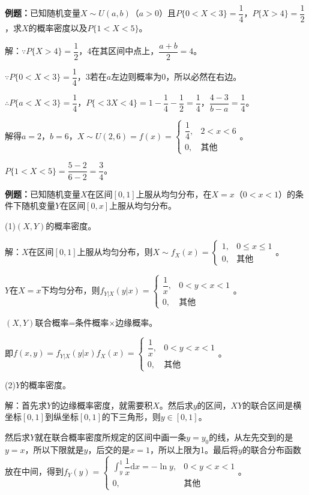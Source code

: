 \documentclass[UTF8, 12pt]{ctexart}
\begin{document}
\textbf{例题：}已知随机变量$X\sim U(a,b)$（$a>0$）且$P\{0<X<3\}=\dfrac{1}{4}$，$P\{X>4\}=\dfrac{1}{2}$，求$X$的概率密度以及$P\{1<X<5\}$。

解：$\because P\{X>4\}=\dfrac{1}{2}$，4在其区间中点上，$\dfrac{a+b}{2}=4$。

$\because P\{0<X<3\}=\dfrac{1}{4}$，$3$若在$a$左边则概率为0，所以必然在右边。

$\therefore P\{a<X<3\}=\dfrac{1}{4}$，$P\{<3X<4\}=1-\dfrac{1}{4}-\dfrac{1}{2}=\dfrac{1}{4}$，$\dfrac{4-3}{b-a}=\dfrac{1}{4}$。

解得$a=2$，$b=6$，$X\sim U(2,6)=f(x)=\left\{\begin{array}{ll}
    \dfrac{1}{4}, & 2<x<6 \\
    0, & \text{其他}
\end{array}\right.$。

$P\{1<X<5\}=\dfrac{5-2}{6-2}=\dfrac{3}{4}$。

\textbf{例题：}已知随机变量$X$在区间$[0,1]$上服从均匀分布，在$X=x$（$0<x<1$）的条件下随机变量$Y$在区间$[0,x]$上服从均匀分布。

(1)$(X,Y)$的概率密度。

解：$X$在区间$[0,1]$上服从均匀分布，则$X\sim f_X(x)=\left\{\begin{array}{ll}
    1, & 0\leqslant x\leqslant1 \\
    0, & \text{其他}
\end{array}\right.$。

$Y$在$X=x$下均匀分布，则$f_{Y|X}(y|x)=\left\{\begin{array}{ll}
    \dfrac{1}{x}, & 0<y<x<1 \\
    0, & \text{其他}
\end{array}\right.$。

$(X,Y)$联合概率=条件概率×边缘概率。

即$f(x,y)=f_{Y|X}(y|x)f_X(x)=\left\{\begin{array}{ll}
    \dfrac{1}{x}, & 0<y<x<1 \\
    0, & \text{其他}
\end{array}\right.$。

(2)$Y$的概率密度。

解：首先求$Y$的边缘概率密度，就需要积$X$。然后求$y$的区间，$XY$的联合区间是横坐标$[0,1]$到纵坐标$[0,1]$的下三角形，则$y\in[0,1]$。

然后求$Y$就在联合概率密度所规定的区间中画一条$y=y_0$的线，从左先交到的是$y=x$，所以下限就是$y$，后交的是$x=1$，所以上限为1。最后将$y$的联合分布函数放在中间，得到$f_Y(y)=\left\{\begin{array}{ll}
    \displaystyle{\int_y^1\dfrac{1}{x}\textrm{d}x}=-\ln y, & 0<y<x<1 \\
    0, & \text{其他}
\end{array}\right.$。
\end{document}
